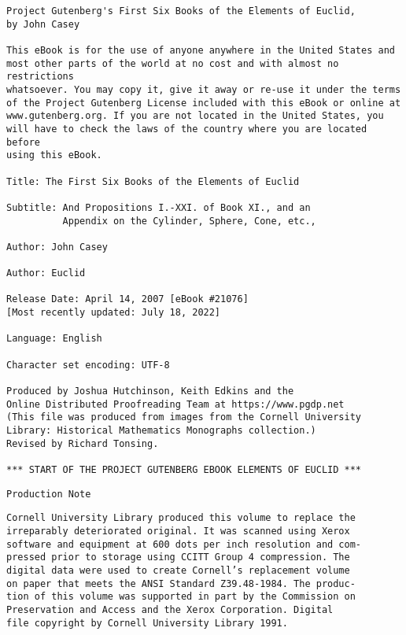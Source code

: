 \documentclass[oneside]{book}
\begin{document}
\pagestyle{empty}

\thispagestyle{empty}
\small
\begin{verbatim}
Project Gutenberg's First Six Books of the Elements of Euclid,
by John Casey

This eBook is for the use of anyone anywhere in the United States and
most other parts of the world at no cost and with almost no restrictions
whatsoever. You may copy it, give it away or re-use it under the terms
of the Project Gutenberg License included with this eBook or online at
www.gutenberg.org. If you are not located in the United States, you
will have to check the laws of the country where you are located before
using this eBook.

Title: The First Six Books of the Elements of Euclid

Subtitle: And Propositions I.-XXI. of Book XI., and an
          Appendix on the Cylinder, Sphere, Cone, etc.,

Author: John Casey

Author: Euclid

Release Date: April 14, 2007 [eBook #21076]
[Most recently updated: July 18, 2022]

Language: English

Character set encoding: UTF-8

Produced by Joshua Hutchinson, Keith Edkins and the
Online Distributed Proofreading Team at https://www.pgdp.net
(This file was produced from images from the Cornell University
Library: Historical Mathematics Monographs collection.)
Revised by Richard Tonsing.

*** START OF THE PROJECT GUTENBERG EBOOK ELEMENTS OF EUCLID ***
\end{verbatim}
\normalsize

\frontmatter
\pagestyle {empty}



\begin{center}
\texttt{Production Note}
\end{center}

\noindent
\texttt{Cornell University Library produced this volume to replace the \\
irreparably deteriorated original. It was scanned using Xerox \\
software and equipment at 600 dots per inch resolution and com- \\
pressed prior to storage using CCITT Group 4 compression. The \\
digital data were used to create Cornell's replacement volume \\
on paper that meets the ANSI Standard Z39.48-1984. The produc- \\
tion of this volume was supported in part by the Commission on \\
Preservation and Access and the Xerox Corporation. Digital \\
file copyright by Cornell University Library 1991.}
\end{document}
